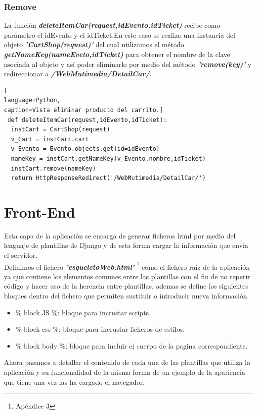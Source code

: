 \subsubsection*{Remove}
La función \textit{\textbf{deleteItemCar(request,idEvento,idTicket)}} recibe como parámetro el idEvento y el idTicket.En este caso se realiza una instancia del objeto \textit{\textbf{'CartShop(request)'}} del cual utilizamos el método \textit{\textbf{getNameKey(nameEveto,idTicket)}} para obtener el nombre de la clave asociada al objeto y así poder eliminarlo por medio del método \textit{\textbf{'remove(key)'}}  y redireccionar a \textit{\textbf{/WebMutimedia/DetailCar/}}.
\begin{lstlisting}[
language=Python,
caption=Vista eliminar producto del carrito.]
 def deleteItemCar(request,idEvento,idTicket):
  instCart = CartShop(request)
  v_Cart = instCart.cart
  v_Evento = Evento.objects.get(id=idEvento)
  nameKey = instCart.getNameKey(v_Evento.nombre,idTicket)
  instCart.remove(nameKey)
  return HttpResponseRedirect('/WebMutimedia/DetailCar/')
\end{lstlisting}

\section{Front-End}
Esta capa de la aplicación se encarga de generar ficheros html por medio del lenguaje de plantillas de Django y de esta forma cargar la información que envía el servidor.
\\Definimos el fichero \textit{\textbf{'esqueletoWeb.html'}} \footnote{Apéndice 3} como el fichero raíz de la aplicación ya que contiene los elementos comunes entre las plantillas con el fin de no repetir código y hacer uso de la herencia entre plantillas, ademas se define los siguientes bloques dentro del fichero que permiten sustituir o introducir nueva información.
\begin{itemize}
\item {\% block JS \%}: bloque para incrustar scripts.
\item {\% block css \%}: bloque para incrustar ficheros de estilos.
\item {\% block body \%}: bloque para incluir el cuerpo de la pagina correspondiente.
\end{itemize}
Ahora pasamos a detallar el contenido de cada una de las plantillas que utiliza la aplicación y su funcionalidad de la misma forma de un ejemplo de la apariencia que tiene una vez las ha cargado el navegador.
